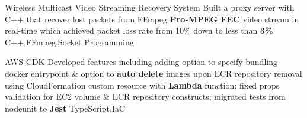 \begin{projects}
  \project
  {Wireless Multicast Video Streaming Recovery System}{}
  {}
  {Built a proxy server with C++ that recover lost packets from FFmpeg \textbf{Pro-MPEG FEC} video stream in real-time which achieved packet loss rate from 10\% down to less than \textbf{3\%}}
  {C++,FFmpeg,Socket Programming}

  \project
  {AWS CDK}{}
  {}
  {Developed features including adding option to specify bundling docker entrypoint \& option to \textbf{auto delete} images upon ECR repository removal using CloudFormation custom resource with \textbf{Lambda} function; fixed props validation for EC2 volume \& ECR repository constructs; migrated tests from nodeunit to \textbf{Jest}}
  {TypeScript,IaC}

\end{projects}
